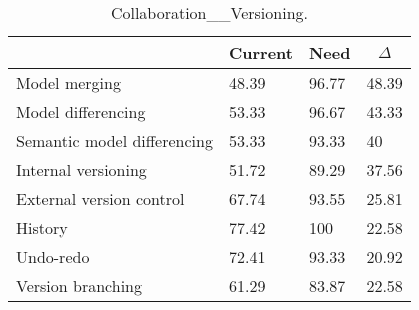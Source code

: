 
  \begin{table*}[]
  \centering
  \notsotiny
  \caption{ Collaboration__Versioning.}
\label{tab:collaboration__versioning}
\begin{tabular}{|l|l|l|l|}
  \hline
  \rowcolor[HTML]{C0C0C0}
    \multicolumn{1}{|c|}{Feature} & \multicolumn{1}{c|}{Current} & \multicolumn{1}{c|}{Need} & \multicolumn{1}{c|}{$\Delta$} \\ \hline
  Model merging & 48.39 & 96.77 & 48.39 \\ \hline 
Model differencing & 53.33 & 96.67 & 43.33 \\ \hline 
Semantic model differencing & 53.33 & 93.33 & 40 \\ \hline 
Internal versioning & 51.72 & 89.29 & 37.56 \\ \hline 
External version control & 67.74 & 93.55 & 25.81 \\ \hline 
History & 77.42 & 100 & 22.58 \\ \hline 
Undo-redo & 72.41 & 93.33 & 20.92 \\ \hline 
Version branching & 61.29 & 83.87 & 22.58 \\ \hline 
\end{tabular}%
  \end{table*}